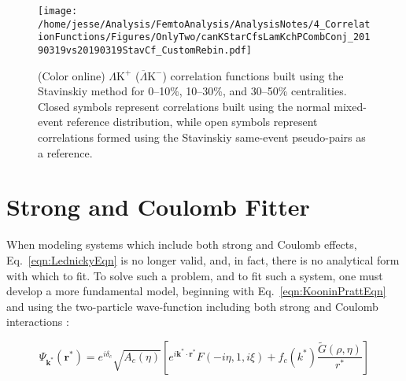 \documentclass[ALICE,manyauthors]{cernphprep}
\newcommand{\LamKchP}{$\Lambda\mathrm{K^{+}}$\xspace}
\newcommand{\LamKchPALamKchM}{$\Lambda\mathrm{K^{+}}$ ($\overline{\Lambda}\mathrm{K^{-}}$)\xspace}
\begin{document}
\begin{figure}[h!]
  \centering
  \texttt{[image: /home/jesse/Analysis/FemtoAnalysis/AnalysisNotes/4\_CorrelationFunctions/Figures/OnlyTwo/canKStarCfsLamKchPCombConj\_20190319vs20190319StavCf\_CustomRebin.pdf]}
  \caption[\LamKchP Stavinskiy Correlation Functions]
  {
  (Color online) \LamKchPALamKchM correlation functions built using the Stavinskiy method for 0--10\%, 10--30\%, and 30--50\% centralities.  Closed symbols represent correlations built using the normal mixed-event reference distribution, while open symbols represent correlations formed using the Stavinskiy same-event pseudo-pairs as a reference.
  }
  \label{fig:StavCfs_Correct_LamKchP}
\end{figure} 



\section{Strong and Coulomb Fitter}
\label{App:CoulombFitter}

When modeling systems which include both strong and Coulomb effects, Eq.\ \ref{eqn:LednickyEqn} is no longer valid, and, in fact, there is no analytical form with which to fit.
To solve such a problem, and to fit such a system, one must develop a more fundamental model, beginning with Eq.\ \ref{eqn:KooninPrattEqn} and using the two-particle wave-function including both strong and Coulomb interactions \cite{Lednicky:2005tb}:

\begin{equation}
 \Psi_{\mathbf{k^{*}}}(\mathbf{r^{*}}) = e^{i\delta_{c}}\sqrt{A_{c}(\eta)}[e^{i\mathbf{k^{*}} \cdot \mathbf{r^{*}}}F(-i\eta,1,i\xi) + f_{c}(k^{*})\frac{\tilde{G}(\rho,\eta)}{r^{*}}]
\label{eqn:CoulombWaveFcn}
\end{equation}
\end{document}
